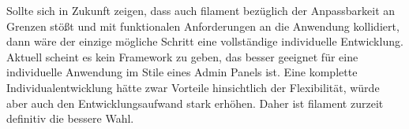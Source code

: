 Sollte sich in Zukunft zeigen, dass auch filament bezüglich der Anpassbarkeit an Grenzen stößt und mit funktionalen Anforderungen an die Anwendung kollidiert, dann wäre der einzige mögliche Schritt eine vollständige individuelle Entwicklung.
Aktuell scheint es kein Framework zu geben, das besser geeignet für eine individuelle Anwendung im Stile eines Admin Panels ist.
Eine komplette Individualentwicklung hätte zwar Vorteile hinsichtlich der Flexibilität, würde aber auch den Entwicklungsaufwand stark erhöhen.
Daher ist filament zurzeit definitiv die bessere Wahl.
